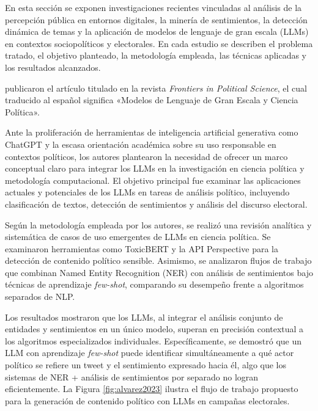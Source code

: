 En esta sección se exponen investigaciones recientes vinculadas al análisis de la percepción pública en entornos digitales, la minería de sentimientos, la detección dinámica de temas y la aplicación de modelos de lenguaje de gran escala (LLMs) en contextos sociopolíticos y electorales. En cada estudio se describen el problema tratado, el objetivo planteado, la metodología empleada, las técnicas aplicadas y los resultados alcanzados.

\cite{pr_alvarez2023llm_political} publicaron el artículo titulado  en la revista \textit{Frontiers in Political Science}, el cual traducido al español significa «Modelos de Lenguaje de Gran Escala y Ciencia Política».
 
Ante la proliferación de herramientas de inteligencia artificial generativa como ChatGPT y la escasa orientación académica sobre su uso responsable en contextos políticos, los autores plantearon la necesidad de ofrecer un marco conceptual claro para integrar los LLMs en la investigación en ciencia política y metodología computacional. El objetivo principal fue examinar las aplicaciones actuales y potenciales de los LLMs en tareas de análisis político, incluyendo clasificación de textos, detección de sentimientos y análisis del discurso electoral.
 
Según la metodología empleada por los autores, se realizó una revisión analítica y sistemática de casos de uso emergentes de LLMs en ciencia política. Se examinaron herramientas como ToxicBERT y la API Perspective para la detección de contenido político sensible. Asimismo, se analizaron flujos de trabajo que combinan Named Entity Recognition (NER) con análisis de sentimientos bajo técnicas de aprendizaje \textit{few-shot}, comparando su desempeño frente a algoritmos separados de NLP.
 
Los resultados mostraron que los LLMs, al integrar el análisis conjunto de entidades y sentimientos en un único modelo, superan en precisión contextual a los algoritmos especializados individuales. Específicamente, se demostró que un LLM con aprendizaje \textit{few-shot} puede identificar simultáneamente a qué actor político se refiere un tweet y el sentimiento expresado hacia él, algo que los sistemas de NER + análisis de sentimientos por separado no logran eficientemente. La Figura \ref{fig:alvarez2023} ilustra el flujo de trabajo propuesto para la generación de contenido político con LLMs en campañas electorales.
 
